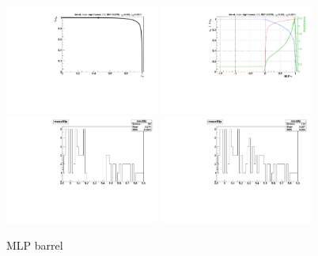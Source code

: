 \begin{figure}
  \centering
  \includegraphics[width=0.45\textwidth]{Figures/mlp/MLP_barrel_roc}
  \includegraphics[width=0.45\textwidth]{Figures/mlp/MLP_barrel_eff} \\
  \includegraphics[width=0.45\textwidth]{Figures/mlp/MLP_barrel_mass}
  \includegraphics[width=0.45\textwidth]{Figures/mlp/MLP_barrel_mass_unblind}
\caption{MLP barrel}
\end{figure}


